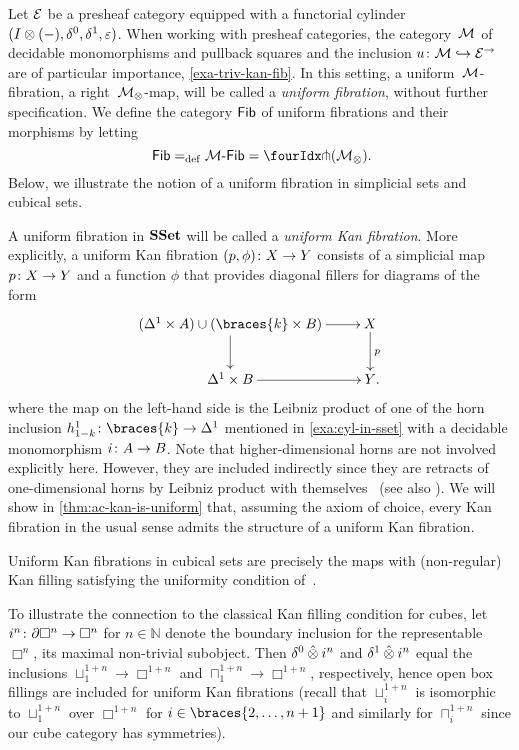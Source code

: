\documentclass[reqno,10pt,a4paper,oneside,draft]{amsart}
\begin{document}
\begin{example}
Let $\catE$ be a presheaf category equipped with a functorial cylinder $(\interval \otimes (-), \lcyl, \rcyl, \ccyl)$.
When working with presheaf categories, the category~$\cal{M}$ of decidable monomorphisms and pullback squares and the inclusion $u \co \cal{M} \hookrightarrow \catE^\to$ are of particular importance, \cf \cref{exa-triv-kan-fib}.
In this setting, a uniform~$\cal{M}$-fibration, \ie a right~$\cal{M}_\otimes$-map, will be called a \emph{uniform fibration}, without further specification.
We define the category $\Fib$ of uniform fibrations and their morphisms by letting
\[
  \Fib \defeq \Fib[\cal{M}] = \liftr{(\cal{M}_\otimes)} \rlap{.}
\]
Below, we illustrate the notion of a uniform fibration in simplicial sets and cubical sets.
\end{example}

\begin{example}
A uniform fibration in $\SSet$ will be called a \emph{uniform Kan fibration}.
More explicitly, a uniform Kan fibration $(p, \phi) \co X \to Y$ consists of a simplicial map $p \co X \to Y$ and a function $\phi$ that provides diagonal fillers for diagrams of the form
\[
\xymatrix{
  (\Delta^1 \times A) \cup (\braces{k} \times B)
  \ar[r]
  \ar[d]
&
  X
  \ar[d]^{p}
\\
  \Delta^1 \times B
  \ar[r]
&
  Y
\rlap{.}}
\]
where the map on the left-hand side is the Leibniz product of one of the horn inclusion $h_{1-k}^1 \co \braces{k} \to \Delta^1$ mentioned in \cref{exa:cyl-in-sset} with a decidable monomorphism $i \co A \to B$.
Note that higher-dimensional horns are not involved explicitly here.
However, they are included indirectly since they are retracts of one-dimensional horns by Leibniz product with themselves~\cite{joyal-quaderns} (see also \cite[Proposition 2.1.2.6]{lurie:htt}).
We will show in \cref{thm:ac-kan-is-uniform} that, assuming the axiom of choice, every Kan fibration in the usual sense admits the structure of a uniform Kan fibration.
\end{example}

\begin{example}
Uniform Kan fibrations in cubical sets are precisely the maps with (non-regular) Kan filling satisfying the uniformity condition of~\cite{coquand-variation}.

To illustrate the connection to the classical Kan filling condition for cubes, let $i^n \co \partial \Box^n \to \Box^n$ for $n \in \mathbb{N}$ denote the boundary inclusion for the representable $\Box^n$, \ie its maximal non-trivial subobject.
Then $\lcyl \hatotimes i^n$ and $\rcyl \hatotimes i^n$ equal the inclusions $\sqcup_1^{1 + n} \to \Box^{1 + n}$ and $\sqcap_1^{1 + n} \to \Box^{1 + n}$, respectively, hence open box fillings are included for uniform Kan fibrations (recall that $\sqcup_i^{1+n}$ is isomorphic to $\sqcup_1^{1+n}$ over $\Box^{1+n}$ for $i \in \braces{2, \ldots, n + 1}$ and similarly for $\sqcap_i^{1+n}$ since our cube category has symmetries).
\end{example}
\end{document}
